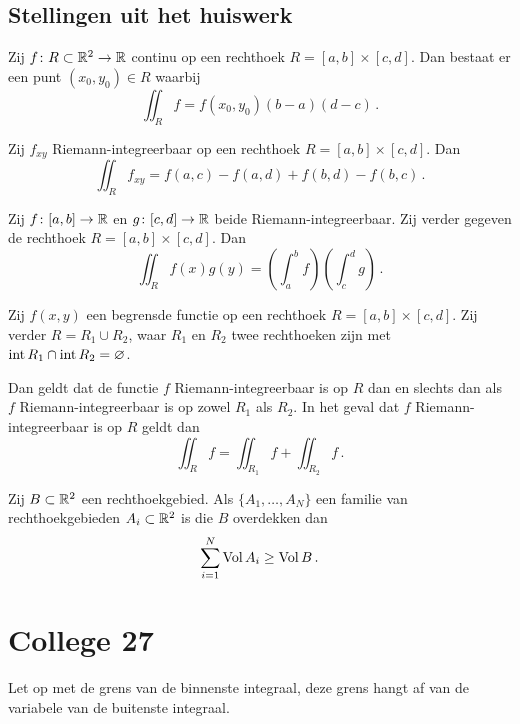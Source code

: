 \documentclass{2wa40summary}
\begin{document}
		\subsection{Stellingen uit het huiswerk}
		\begin{theorem}[\text{[K]} 11.1.10]
			Zij $f\colon R \subset \mathbb{R}^2 \to \mathbb{R}$ continu op een rechthoek $R = [a, b] \times [c, d]$.
			Dan bestaat er een punt $(x_0, y_0) \in R$ waarbij
			\[
			\iint_R f = f(x_0, y_0) (b - a) (d - c)\,.
			\]
		\end{theorem}
		\begin{theorem}[\text{[K] 11.2.6a}]
			Zij $f_{xy}$ Riemann-integreerbaar op een rechthoek $R = [a, b] \times [c, d]$. Dan
			\[ 
				\iint_R f_{xy} = f(a, c) - f(a, d) + f(b, d) - f(b, c)\,.
			 \]
		\end{theorem}
		\begin{theorem}[\text{[K] 11.2.7a}]
			Zij $f\colon [a, b] \to \mathbb{R}$ en $g\colon [c, d] \to \mathbb{R}$ beide Riemann-integreerbaar. Zij verder gegeven de rechthoek $R = [a, b] \times [c, d]$. Dan
			\[ 
				\iint_R f(x) g(y) = \left( \int_a^b f \right) \left( \int_c^d g \right)\,.
			 \]
		\end{theorem}
		\begin{theorem}
			Zij $f(x, y)$ een begrensde functie op een rechthoek $R = [a, b] \times [c, d]$. Zij verder $R = R_1 \cup R_2$, waar $R_1$ en $R_2$ twee rechthoeken zijn met $\operatorname{\mathop{int}} R_1 \cap \operatorname{\mathop{int}} R_2 = \varnothing$.
			
			Dan geldt dat de functie $f$ Riemann-integreerbaar is op $R$ dan en slechts dan als $f$ Riemann-integreerbaar is op zowel $R_1$ als $R_2$. In het geval dat $f$ Riemann-integreerbaar is op $R$ geldt dan
			\[
			\iint_R f = \iint_{R_1} f + \iint_{R_2} f \,.
			\]
		\end{theorem}
		\begin{theorem}
			Zij $B \subset \mathbb{R}^2$ een rechthoekgebied. Als $\{ A_1, \dots, A_N \}$ een familie van rechthoekgebieden $A_i \subset \mathbb{R}^2$ is die $B$ overdekken dan
			\[
			\sum_{i=1}^N \operatorname{Vol} A_i \ge \operatorname{Vol} B \,.
			\]
		\end{theorem}
			
	\newpage
	\section{College 27}
		\begin{valkuil}
			Let op met de grens van de binnenste integraal, deze grens hangt af van de variabele van de buitenste integraal.
		\end{valkuil}
		
\end{document}
